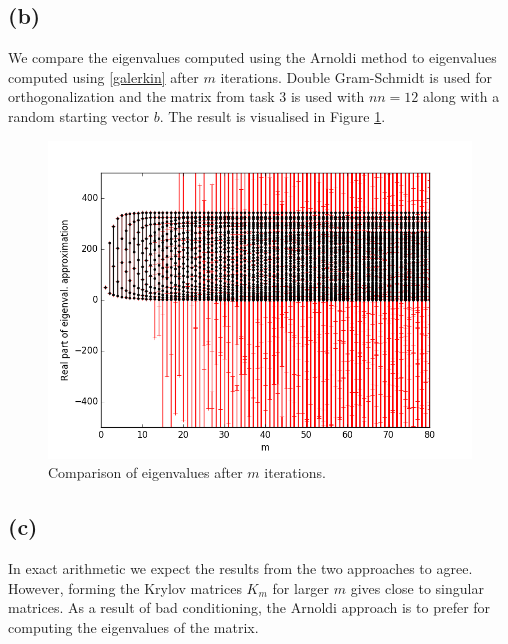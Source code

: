 \subsection{(b)}
We compare the eigenvalues computed using the Arnoldi method to eigenvalues computed using \eqref{galerkin} after $m$ iterations. Double Gram-Schmidt is used for orthogonalization and the matrix from task 3 is used with $nn=12$ along with a random starting vector $b$. The result is visualised in Figure \ref{res}.
\begin{figure}[h]
\centering
\includegraphics[scale=0.5]{eigenArnoldi.png}
\caption{Comparison of eigenvalues after $m$ iterations.}
\label{res}
\end{figure}
\subsection{(c)}
In exact arithmetic we expect the results from the two approaches to agree. However, forming the Krylov matrices $K_m$ for larger $m$ gives close to singular matrices. As a result of bad conditioning, the Arnoldi approach is to prefer for computing the eigenvalues of the matrix. 
